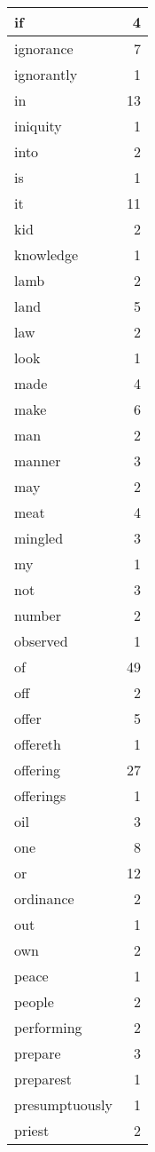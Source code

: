 \begin{center}
\begin{longtable}{l|r}
if & 4 \\ \hline
ignorance & 7 \\ \hline
ignorantly & 1 \\ \hline
in & 13 \\ \hline
iniquity & 1 \\ \hline
into & 2 \\ \hline
is & 1 \\ \hline
it & 11 \\ \hline
kid & 2 \\ \hline
knowledge & 1 \\ \hline
lamb & 2 \\ \hline
land & 5 \\ \hline
law & 2 \\ \hline
look & 1 \\ \hline
made & 4 \\ \hline
make & 6 \\ \hline
man & 2 \\ \hline
manner & 3 \\ \hline
may & 2 \\ \hline
meat & 4 \\ \hline
mingled & 3 \\ \hline
my & 1 \\ \hline
not & 3 \\ \hline
number & 2 \\ \hline
observed & 1 \\ \hline
of & 49 \\ \hline
off & 2 \\ \hline
offer & 5 \\ \hline
offereth & 1 \\ \hline
offering & 27 \\ \hline
offerings & 1 \\ \hline
oil & 3 \\ \hline
one & 8 \\ \hline
or & 12 \\ \hline
ordinance & 2 \\ \hline
out & 1 \\ \hline
own & 2 \\ \hline
peace & 1 \\ \hline
people & 2 \\ \hline
performing & 2 \\ \hline
prepare & 3 \\ \hline
preparest & 1 \\ \hline
presumptuously & 1 \\ \hline
priest & 2 \\ \hline

\end{longtable}
\end{center}
